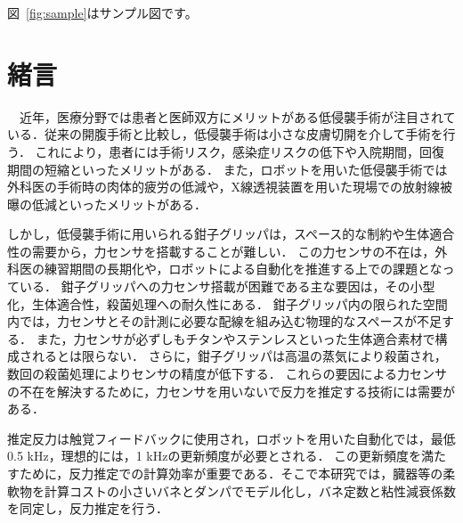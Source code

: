 \documentclass[a4paper]{jarticle}
\begin{document}
図~\ref{fig:sample}はサンプル図です。
\fi

\section{緒言}
　近年，医療分野では患者と医師双方にメリットがある低侵襲手術が注目されている\cite{MIS_ref1}．従来の開腹手術と比較し，低侵襲手術は小さな皮膚切開を介して手術を行う．
これにより，患者には手術リスク，感染症リスクの低下\cite{MIS_ref2}や入院期間\cite{MIS_ref3}，回復期間の短縮\cite{MIS_ref4}といったメリットがある．
また，ロボットを用いた低侵襲手術では外科医の手術時の肉体的疲労の低減や，X線透視装置を用いた現場での放射線被曝の低減といったメリットがある\cite{MIS_ref5}．

しかし，低侵襲手術に用いられる鉗子グリッパは，スペース的な制約\cite{MIS_ref1}や生体適合性の需要\cite{MIS_ref6}から，力センサを搭載することが難しい．
この力センサの不在は，外科医の練習期間の長期化\cite{MIS_learning_time}や，ロボットによる自動化を推進する上での課題となっている\cite{RMIS}．
鉗子グリッパへの力センサ搭載が困難である主な要因は，その小型化，生体適合性，殺菌処理への耐久性にある\cite{MIS_ref7}．
鉗子グリッパ内の限られた空間内では，力センサとその計測に必要な配線を組み込む物理的なスペースが不足する\cite{MIS_ref1}．
また，力センサが必ずしもチタンやステンレスといった生体適合素材で構成されるとは限らない\cite{MIS_ref6}．
さらに，鉗子グリッパは高温の蒸気により殺菌され，数回の殺菌処理によりセンサの精度が低下する\cite{MIS_ref7}．
これらの要因による力センサの不在を解決するために，力センサを用いないで反力を推定する技術には需要がある．

 推定反力は触覚フィードバックに使用され，ロボットを用いた自動化では，最低0.5 kHz\cite{fps_ref1}，理想的には，1 kHzの更新頻度が必要とされる\cite{fps_ref2}．
この更新頻度を満たすために，反力推定での計算効率が重要である．そこで本研究では，臓器等の柔軟物を計算コストの小さいバネとダンパでモデル化し，バネ定数と粘性減衰係数を同定し，反力推定を行う．

\end{document}
